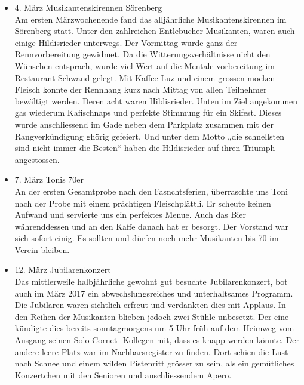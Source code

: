 \begin{history}
\begin{itemize}
            \item 4. März Musikantenskirennen Sörenberg\\
                  Am ersten Märzwochenende fand das alljährliche Musikantenskirennen
                  im Sörenberg statt. Unter den zahlreichen Entlebucher Musikanten,
                  waren auch einige Hildisrieder unterwegs. Der Vormittag wurde ganz
                  der Rennvorbereitung gewidmet. Da die Witterungsverhältnisse nicht
                  den Wünschen entsprach, wurde viel Wert auf die Mentale
                  vorbereitung im Restaurant Schwand gelegt. Mit Kaffee Luz und
                  einem grossen mocken Fleisch konnte der Rennhang kurz nach Mittag
                  von allen Teilnehmer bewältigt werden. Deren acht waren
                  Hildisrieder. Unten im Ziel angekommen gas wiederum Kafischnaps
                  und perfekte Stimmung für ein Skifest. Dieses wurde anschliessend
                  im Gade neben dem Parkplatz zusammen mit der Rangverkündigung
                  ghörig gefeiert. Und unter dem Motto „die schnellsten sind nicht
                  immer die Besten“ haben die Hildisrieder auf ihren Triumph
                  angestossen.

            \item 7. März Tonis 70er\\
                  An der ersten Gesamtprobe nach den Fasnchtsferien, überraschte uns
                  Toni nach der Probe mit einem prächtigen Fleischplättli. Er
                  scheute keinen Aufwand und servierte uns ein perfektes Menue. Auch
                  das Bier währenddessen und an den Kaffe danach hat er besorgt. Der
                  Vorstand war sich sofort einig. Es sollten und dürfen noch mehr
                  Musikanten bis 70 im Verein bleiben.

            \item 12. März Jubilarenkonzert\\
                  Das mittlerweile halbjährliche gewohnt gut besuchte
                  Jubilarenkonzert, bot auch im März 2017 ein abwechslungsreiches
                  und unterhaltsames Programm. Die Jubilaren waren sichtlich erfreut
                  und verdankten dies mit Applaus. In den Reihen der Musikanten
                  blieben jedoch zwei Stühle unbesetzt. Der eine kündigte dies
                  bereits sonntagmorgens um 5 Uhr früh auf dem Heimweg vom Ausgang
                  seinen Solo Cornet- Kollegen mit, dass es knapp werden könnte. Der
                  andere leere Platz war im Nachbarsregister zu finden. Dort schien
                  die Lust nach Schnee und einem wilden Pistenritt grösser zu sein,
                  als ein gemütliches Konzertchen mit den Senioren und
                  anschliessendem Apero.


\end{itemize}
\end{history}
